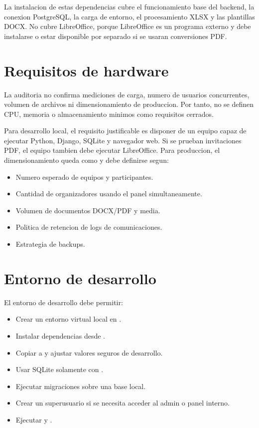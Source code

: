 La instalacion de estas dependencias cubre el funcionamiento base del backend, la conexion PostgreSQL, la carga de entorno, el procesamiento XLSX y las plantillas DOCX. No cubre LibreOffice, porque LibreOffice es un programa externo y debe instalarse o estar disponible por separado si se usaran conversiones PDF.

\section{Requisitos de hardware}
\label{sec:requisitos-hardware}

La auditoria no confirma mediciones de carga, numero de usuarios concurrentes, volumen de archivos ni dimensionamiento de produccion. Por tanto, no se definen CPU, memoria o almacenamiento minimos como requisitos cerrados.

Para desarrollo local, el requisito justificable es disponer de un equipo capaz de ejecutar Python, Django, SQLite y navegador web. Si se prueban invitaciones PDF, el equipo tambien debe ejecutar LibreOffice. Para produccion, el dimensionamiento queda como \MarcadorProduccionPendiente{} y debe definirse segun:

\begin{itemize}
  \item Numero esperado de equipos y participantes.
  \item Cantidad de organizadores usando el panel simultaneamente.
  \item Volumen de documentos DOCX/PDF y media.
  \item Politica de retencion de logs de comunicaciones.
  \item Estrategia de backups.
\end{itemize}

\section{Entorno de desarrollo}
\label{sec:requisitos-desarrollo}

El entorno de desarrollo debe permitir:

\begin{itemize}
  \item Crear un entorno virtual local en .
  \item Instalar dependencias desde .
  \item Copiar  a  y ajustar valores seguros de desarrollo.
  \item Usar SQLite solamente con .
  \item Ejecutar migraciones sobre una base local.
  \item Crear un superusuario si se necesita acceder al admin o panel interno.
  \item Ejecutar  y .
\end{itemize}

